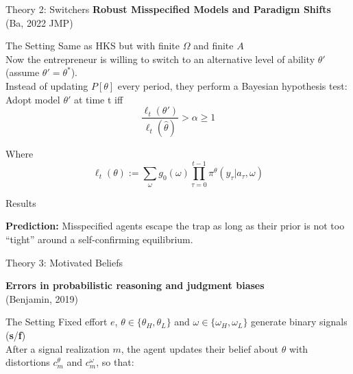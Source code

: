 \documentclass[aspectratio=169]{beamer}
\begin{document}


\begin{frame}{Theory 2: Switchers}
    \Large\textbf{ Robust Misspecified Models and Paradigm Shifts \\}
    (Ba, 2022 JMP)
\end{frame}


\begin{frame}{The Setting}
    Same as HKS but with finite $\Omega$ and finite $A$\\
    \bigskip
    Now the entrepreneur is willing to switch to an alternative level of ability $\theta'$ (assume $\theta' = \theta^*$).\\
    \bigskip
    Instead of updating $P[\theta]$ every period, they perform a Bayesian hypothesis test:\\
    \bigskip
    Adopt model $\theta'$ at time t iff \\
    $$\frac{\ell_t (\theta')}{\ell_t(\hat{\theta})}>\alpha\geq1$$

    Where $$\ell_t(\theta) := \sum_{\omega}g_0(\omega)\prod_{\tau=0}^{t-1}\pi^\theta(y_\tau|a_\tau, \omega)$$
  
\end{frame}

\begin{frame}{Results}

    \textbf{Prediction:} Misspecified agents escape the trap as long as their prior is not too ``tight'' around a self-confirming equilibrium.
  
\end{frame}

\begin{frame}{Theory 3: Motivated Beliefs}
    
    \Large\textbf{Errors in probabilistic reasoning and judgment biases}\\
    (Benjamin, 2019)\\
    
\end{frame}

\begin{frame}{The Setting}
    Fixed effort $e$, $\theta \in \{\theta_H, \theta_L\}$ and $\omega \in \{\omega_H, \omega_L\}$ generate binary signals (\textbf{s}/\textbf{f})\\
    \bigskip
    After a signal realization $m$, the agent updates their belief about $\theta$ with distortions $c_m^\theta$ and $c_m^\omega$, so that:\\


\end{frame}
\end{document}
\end{frame}
\end{document}
\end{frame}
\end{document}
